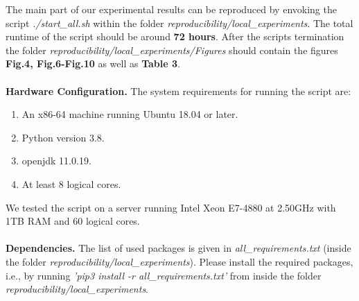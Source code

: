 \documentclass{article}
\begin{document}
The main part of our experimental results can be reproduced by envoking the script \textit{./start\_all.sh} within the folder \textit{reproducibility/local\_experiments}. The total runtime of the script should be around \textbf{72 hours}. After the scripts termination the folder \textit{reproducibility/local\_experiments/Figures} should contain the figures \textbf{Fig.4, Fig.6-Fig.10} as well as \textbf{Table 3}.
\\
\\
\textbf{Hardware Configuration.}
The system requirements for running the script are:
\begin{enumerate}
\item An x86-64 machine running Ubuntu 18.04 or later.
\item Python version 3.8.
\item openjdk 11.0.19.
\item At least 8 logical cores.
\end{enumerate}
We tested the script on a server running Intel Xeon E7-4880 at 2.50GHz with 1TB RAM and 60 logical cores.
\\
\\
\textbf{Dependencies.}
The list of used packages is given in \textit{all\_requirements.txt} (inside the folder \textit{reproducibility/local\_experiments}).
Please install the required packages, i.e., by running \textit{'pip3 install -r all\_requirements.txt'} from inside the folder \textit{reproducibility/local\_experiments}. 
\\
\\
\end{document}
